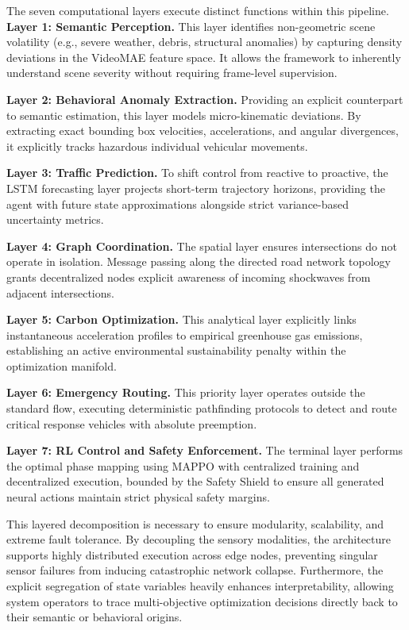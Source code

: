 The seven computational layers execute distinct functions within this pipeline. 
\textbf{Layer 1: Semantic Perception.} This layer identifies non-geometric scene volatility (e.g., severe weather, debris, structural anomalies) by capturing density deviations in the VideoMAE feature space. It allows the framework to inherently understand scene severity without requiring frame-level supervision.

\textbf{Layer 2: Behavioral Anomaly Extraction.} Providing an explicit counterpart to semantic estimation, this layer models micro-kinematic deviations. By extracting exact bounding box velocities, accelerations, and angular divergences, it explicitly tracks hazardous individual vehicular movements.

\textbf{Layer 3: Traffic Prediction.} To shift control from reactive to proactive, the LSTM forecasting layer projects short-term trajectory horizons, providing the agent with future state approximations alongside strict variance-based uncertainty metrics.

\textbf{Layer 4: Graph Coordination.} The spatial layer ensures intersections do not operate in isolation. Message passing along the directed road network topology grants decentralized nodes explicit awareness of incoming shockwaves from adjacent intersections.

\textbf{Layer 5: Carbon Optimization.} This analytical layer explicitly links instantaneous acceleration profiles to empirical greenhouse gas emissions, establishing an active environmental sustainability penalty within the optimization manifold.

\textbf{Layer 6: Emergency Routing.} This priority layer operates outside the standard flow, executing deterministic pathfinding protocols to detect and route critical response vehicles with absolute preemption.

\textbf{Layer 7: RL Control and Safety Enforcement.} The terminal layer performs the optimal phase mapping using MAPPO with centralized training and decentralized execution, bounded by the Safety Shield to ensure all generated neural actions maintain strict physical safety margins.

This layered decomposition is necessary to ensure modularity, scalability, and extreme fault tolerance. By decoupling the sensory modalities, the architecture supports highly distributed execution across edge nodes, preventing singular sensor failures from inducing catastrophic network collapse. Furthermore, the explicit segregation of state variables heavily enhances interpretability, allowing system operators to trace multi-objective optimization decisions directly back to their semantic or behavioral origins.

